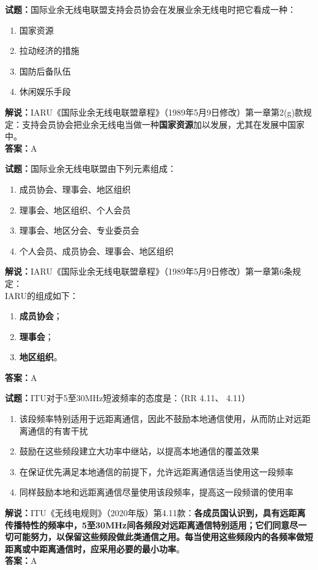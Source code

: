 \documentclass{ctexbook}
\begin{document}
\vspace{\baselineskip}

\noindent\textbf{试题：}国际业余无线电联盟支持会员协会在发展业余无线电时把它看成一种：
\begin{enumerate}[leftmargin=3em]
  \item 国家资源
  \item 拉动经济的措施
  \item 国防后备队伍
  \item 休闲娱乐手段
\end{enumerate}
\noindent\textbf{解说：}IARU《国际业余无线电联盟章程》（1989年5月9日修改）第一章第2(g)款规定：支持会员协会把业余无线电当做一种\textbf{国家资源}加以发展，尤其在发展中国家中。\\\noindent\textbf{答案：}A

\vspace{\baselineskip}

\noindent\textbf{试题：}国际业余无线电联盟由下列元素组成：
\begin{enumerate}[leftmargin=3em]
  \item 成员协会、理事会、地区组织
  \item 理事会、地区组织、个人会员
  \item 理事会、地区分会、专业委员会
  \item 个人会员、成员协会、理事会、地区组织
\end{enumerate}
\noindent\textbf{解说：}IARU《国际业余无线电联盟章程》（1989年5月9日修改）第一章第6条规定：\\
IARU的组成如下：
\begin{enumerate}[leftmargin=3em, label=\alph*)]
  \item \textbf{成员协会}；
  \item \textbf{理事会}；
  \item \textbf{地区组织}。
\end{enumerate}
\noindent\textbf{答案：}A

\vspace{\baselineskip}

\noindent\textbf{试题：}ITU对于5至30\unit{\MHz}短波频率的态度是：（RR 4.11、 4.11）
\begin{enumerate}[leftmargin=3em]
  \item 该段频率特别适用于远距离通信，因此不鼓励本地通信使用，从而防止对远距离通信的有害干扰
  \item 鼓励在这些频段建立大功率中继站，以提高本地通信的覆盖效果
  \item 在保证优先满足本地通信的前提下，允许远距离通信适当使用这一段频率
  \item 同样鼓励本地和远距离通信尽量使用该段频率，提高这一段频谱的使用率
\end{enumerate}
\noindent\textbf{解说：}ITU《无线电规则》（2020年版）第4.11款：\textbf{各成员国认识到，具有远距离传播特性的频率中，5至30\unit{\MHz}间各频段对远距离通信特别适用；它们同意尽一切可能努力，以保留这些频段做此类通信之用。每当使用这些频段内的各频率做短距离或中距离通信时，应采用必要的最小功率}。\\\noindent\textbf{答案：}A
\end{document}
